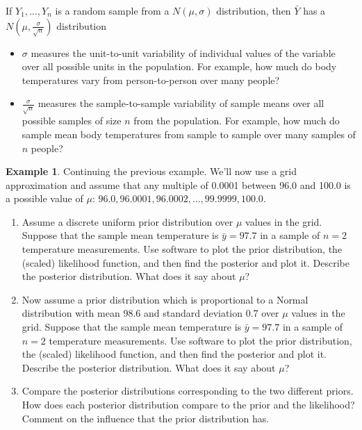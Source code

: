 \documentclass[
]{book}
\providecommand{\tightlist}{%
  \setlength{\itemsep}{0pt}\setlength{\parskip}{0pt}}
\theoremstyle{definition}
\theoremstyle{definition}
\newtheorem{example}{Example}[chapter]
\theoremstyle{definition}
\theoremstyle{remark}
\begin{document}
If \(Y_1, \ldots, Y_n\) is a random sample from a \(N(\mu, \sigma)\) distribution, then \(\bar{Y}\) has a \(N\left(\mu, \frac{\sigma}{\sqrt{n}}\right)\) distribution

\begin{itemize}
\tightlist
\item
  \(\sigma\) measures the unit-to-unit variability of individual values of the variable over all possible units in the population. For example, how much do body temperatures vary from person-to-person over many people?
\item
  \(\frac{\sigma}{\sqrt{n}}\) measures the sample-to-sample variability of sample means over all possible samples of size \(n\) from the population. For example, how much do sample mean body temperatures from sample to sample over many samples of \(n\) people?
\end{itemize}

\begin{example}
\protect\hypertarget{exm:body-temp-discrete2}{}{\label{exm:body-temp-discrete2} }
Continuing the previous example. We'll now use a grid approximation and assume that any multiple of 0.0001 between 96.0 and 100.0 is a possible value of \(\mu\): \(96.0, 96.0001, 96.0002, \ldots, 99.9999, 100.0\).
\end{example}

\begin{enumerate}
\def\labelenumi{\arabic{enumi}.}
\tightlist
\item
  Assume a discrete uniform prior distribution over \(\mu\) values in the grid.
  Suppose that the sample mean temperature is \(\bar{y}=97.7\) in a sample of \(n=2\) temperature measurements.
  Use software to plot the prior distribution, the (scaled) likelihood function, and then find the posterior and plot it. Describe the posterior distribution.
  What does it say about \(\mu\)?
\item
  Now assume a prior distribution which is proportional to a Normal distribution with mean 98.6 and standard deviation 0.7 over \(\mu\) values in the grid.
  Suppose that the sample mean temperature is \(\bar{y}=97.7\) in a sample of \(n=2\) temperature measurements.
  Use software to plot the prior distribution, the (scaled) likelihood function, and then find the posterior and plot it. Describe the posterior distribution.
  What does it say about \(\mu\)?
\item
  Compare the posterior distributions corresponding to the two different priors. How does each posterior distribution compare to the prior and the likelihood? Comment on the influence that the prior distribution has.
\end{enumerate}
\end{document}
